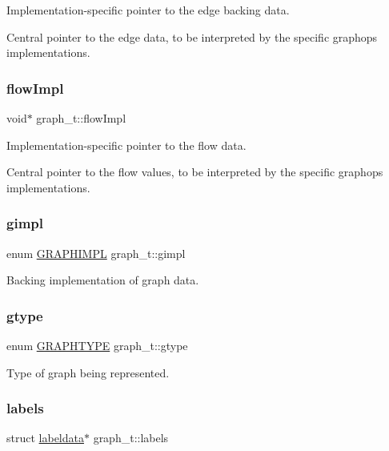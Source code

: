 Implementation-\/specific pointer to the edge backing data. 

Central pointer to the edge data, to be interpreted by the specific graphops implementations. \mbox{\label{structgraph__t_aff85993441e72a7815da3fa1b048e5eb}} 
\subsubsection{\texorpdfstring{flow\+Impl}{flowImpl}}
{\footnotesize\ttfamily void$\ast$ graph\+\_\+t\+::flow\+Impl}



Implementation-\/specific pointer to the flow data. 

Central pointer to the flow values, to be interpreted by the specific graphops implementations. \mbox{\label{structgraph__t_a220aff118ba6d13c927486099988c03d}} 
\subsubsection{\texorpdfstring{gimpl}{gimpl}}
{\footnotesize\ttfamily enum \hyperlink{graphdata_8h_ad7f3a639f97221897a0429715dccefe6}{G\+R\+A\+P\+H\+I\+M\+PL} graph\+\_\+t\+::gimpl}

Backing implementation of graph data. \mbox{\label{structgraph__t_a602be255ab0523e0a5fe28436a29159a}} 
\subsubsection{\texorpdfstring{gtype}{gtype}}
{\footnotesize\ttfamily enum \hyperlink{graphdata_8h_a384e88b524b782ff50439055cbc8a5c2}{G\+R\+A\+P\+H\+T\+Y\+PE} graph\+\_\+t\+::gtype}

Type of graph being represented. \mbox{\label{structgraph__t_a2ea51094b5b0a3b3035895948ded5b44}} 
\subsubsection{\texorpdfstring{labels}{labels}}
{\footnotesize\ttfamily struct \hyperlink{graphdata_8h_a625fc818ed28f282dba71f20cd31b848}{labeldata}$\ast$ graph\+\_\+t\+::labels}

